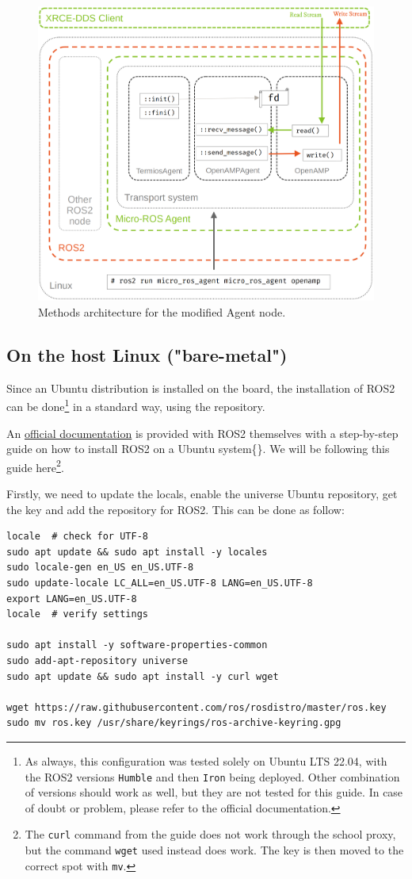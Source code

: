 \documentclass[10pt]{article}
\begin{document}
\begin{figure}[htbp]
\centering
\includegraphics[width=.55\textwidth]{./img/agent_arch.png}
\caption{\label{fig:org6fba007}Methods architecture for the modified Agent node.}
\end{figure}

\subsection{On the host Linux ("bare-metal")}
\label{sec:org25d7bf6}
Since an Ubuntu distribution is installed on the board, the installation of ROS2
can be done\footnote{As always, this configuration was tested solely on Ubuntu LTS 22.04,
with the ROS2 versions \texttt{Humble} and then \texttt{Iron} being deployed.
Other combination of versions should work as well, but they are not
tested for this guide. In case of doubt or problem, please refer to the official documentation.} in a standard way, using the repository.

An \href{https://docs.ros.org/en/humble/Installation/Ubuntu-Install-Debians.html}{official documentation} is provided with ROS2 themselves with a step-by-step guide on how to install
ROS2 on a Ubuntu system\{\}.
We will be following this guide here\footnote{The \texttt{curl} command from the guide does not work through the school proxy,
but the command \texttt{wget} used instead does work. The key is then moved to the correct spot with \texttt{mv}.}.

Firstly, we need to update the locals, enable the universe Ubuntu repository,
get the key and add the repository for ROS2. This can be done as follow:
\begin{verbatim}
locale  # check for UTF-8
sudo apt update && sudo apt install -y locales
sudo locale-gen en_US en_US.UTF-8
sudo update-locale LC_ALL=en_US.UTF-8 LANG=en_US.UTF-8
export LANG=en_US.UTF-8
locale  # verify settings

sudo apt install -y software-properties-common
sudo add-apt-repository universe
sudo apt update && sudo apt install -y curl wget

wget https://raw.githubusercontent.com/ros/rosdistro/master/ros.key
sudo mv ros.key /usr/share/keyrings/ros-archive-keyring.gpg
\end{verbatim}
\end{document}

